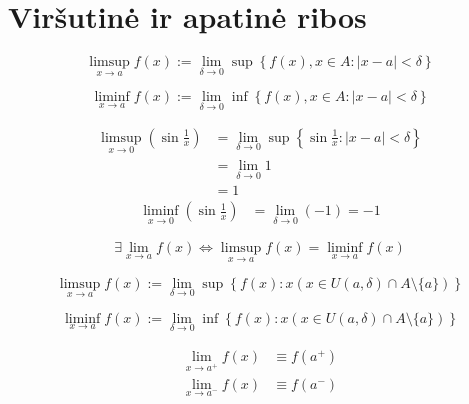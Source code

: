 \section{Viršutinė ir apatinė ribos}

\begin{defn}
  \begin{equation*}
    \limsup _{x \to a} f(x) := 
      \lim _{\delta \to 0} 
      \sup \left\{ f(x), x \in A : |x - a| < \delta \right\}
  \end{equation*}
\end{defn}

\begin{defn}
  \begin{equation*}
    \liminf _{x \to a} f(x) :=
      \lim _{\delta \to 0}
      \inf \left\{ f(x), x \in A : |x - a| < \delta \right\}
  \end{equation*}
\end{defn}

\begin{exmp}
  \begin{align*}
    \limsup _{x \to 0} \left( \sin \frac{1}{x} \right) 
    &= \lim _{\delta \to 0} \sup 
      \left\{ \sin \frac{1}{x} : |x - a| < \delta \right\} \\
    &= \lim _{\delta \to 0} 1 \\
    &= 1
  \end{align*}
  \begin{align*}
    \liminf _{x \to 0} \left( \sin \frac{1}{x} \right) 
    &= \lim _{\delta \to 0} (-1) = -1
  \end{align*}
\end{exmp}

\begin{prop}
  \begin{equation*}
    \exists \lim _{x \to a} f(x) \iff
    \limsup _{x \to a} f(x) = \liminf _{x \to a} f(x)
  \end{equation*}
\end{prop}

\begin{defn}
  \begin{equation*}
    \limsup _{x \to a} f(x) :=
      \lim _{\delta \to 0}
      \sup \left\{ f(x) : x 
        (x \in U(a, \delta) \cap A \setminus \{a\}) 
        \right\}
  \end{equation*}
\end{defn}

\begin{defn}
  \begin{equation*}
    \liminf _{x \to a} f(x) :=
      \lim _{\delta \to 0}
      \inf \left\{ f(x) : x 
        (x \in U(a, \delta) \cap A \setminus \{a\}) 
        \right\}
  \end{equation*}
\end{defn}

\begin{notation}
  \begin{align*}
    \lim _{x \to a^{+}} f(x) &\equiv f(a^{+}) \\
    \lim _{x \to a^{-}} f(x) &\equiv f(a^{-}) \\
  \end{align*}
\end{notation}

